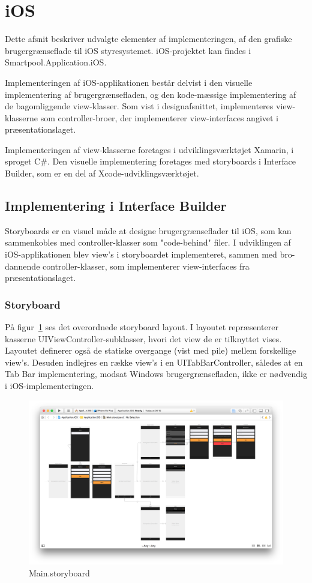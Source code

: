 \section{iOS}
Dette afsnit beskriver udvalgte elementer af implementeringen, af den grafiske brugergrænseflade til iOS styresystemet. iOS-projektet kan findes i Smartpool.Application.iOS.

Implementeringen af iOS-applikationen består delvist i den visuelle implementering af brugergrænsefladen, og den kode-mæssige implementering af de bagomliggende view-klasser. Som vist i designafsnittet, implementeres view-klasserne som controller-broer, der implementerer view-interfaces angivet i præsentationslaget.

Implementeringen af view-klasserne foretages i udviklingsværktøjet Xamarin, i sproget C\#. Den visuelle implementering foretages med storyboards i Interface Builder, som er en del af Xcode-udviklingsværktøjet.

\subsection{Implementering i Interface Builder}
Storyboards er en visuel måde at designe brugergrænseflader til iOS, som kan sammenkobles med controller-klasser som "code-behind" filer. I udviklingen af iOS-applikationen blev view's i storyboardet implementeret, sammen med bro-dannende controller-klasser, som implementerer view-interfaces fra præsentationslaget.

\subsubsection{Storyboard}
På figur~\ref{fig:iosstoryboard} ses det overordnede storyboard layout. I layoutet repræsenterer kasserne UIViewController-subklasser, hvori det view de er tilknyttet vises. Layoutet definerer også de statiske overgange (vist med pile) mellem forskellige view's. Desuden indlejres en række view's i en UITabBarController, således at en Tab Bar implementering, modsat Windows brugergrænsefladen, ikke er nødvendig i iOS-implementeringen.

\begin{figure}
	\centering
	\includegraphics[width=1.0\linewidth]{figs/implementering/ios_imp_storyboard}
	\caption{Main.storyboard}
	\label{fig:iosstoryboard}
\end{figure}

